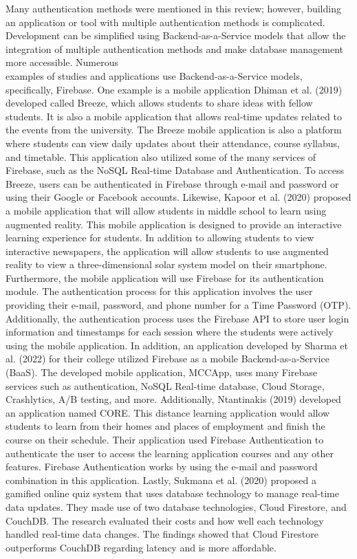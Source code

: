 \documentclass{icsthesis}
\begin{document}
\begin{mainmatter}
\indent Many authentication methods were mentioned in this review; however, building an application or tool with multiple authentication methods is complicated. Development can be simplified using Backend-as-a-Service models that allow the integration of multiple authentication methods and make database management more accessible. Numerous \\examples of studies and applications use Backend-as-a-Service models, specifically, Firebase. One example is a mobile application Dhiman et al. (2019) developed called Breeze, which allows students to share ideas with fellow students. It is also a mobile application that allows real-time updates related to the events from the university. The Breeze mobile application is also a platform where students can view daily updates about their attendance, course syllabus, and timetable. This application also utilized some of the many services of Firebase, such as the NoSQL Real-time Database and Authentication. To access Breeze, users can be authenticated in Firebase through e-mail and password or using their Google or Facebook accounts. Likewise, Kapoor et al. (2020) proposed a mobile application that will allow students in middle school to learn using augmented reality. This mobile application is designed to provide an interactive learning experience for students. In addition to allowing students to view interactive newspapers, the application will allow students to use augmented reality to view a three-dimensional solar system model on their smartphone. Furthermore, the mobile application will use Firebase for its authentication module. The authentication process for this application involves the user providing their e-mail, password, and phone number for a Time Password (OTP). Additionally, the authentication process uses the Firebase API to store user login information and timestamps for each session where the students were actively using the mobile application. In addition, an application developed by Sharma et al. (2022) for their college utilized Firebase as a mobile Backend-as-a-Service (BaaS). The developed mobile application, MCCApp, uses many Firebase services such as authentication, NoSQL Real-time database, Cloud Storage, Crashlytics, A/B testing, and more. Additionally, Ntantinakis (2019) developed an application named CORE. This distance learning application would allow students to learn from their homes and places of employment and finish the course on their schedule. Their application used Firebase Authentication to authenticate the user to access the learning application courses and any other features. Firebase Authentication works by using the e-mail and password combination in this application. Lastly, Sukmana et al. (2020) proposed a gamified online quiz system that uses database technology to manage real-time data updates. They made use of two database technologies, Cloud Firestore, and CouchDB. The research evaluated their costs and how well each technology handled real-time data changes. The findings showed that Cloud Firestore outperforms CouchDB regarding latency and is more affordable. \\


\end{mainmatter}
\end{document}
